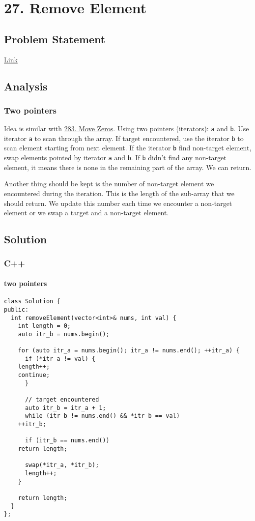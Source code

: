 \documentclass[12pt]{article}
\begin{document}
\section{27. Remove Element \label{orgfb555b2}}
\label{sec:orgef6978a}
\subsection{Problem Statement}
\label{sec:org105e06d}
\href{https://leetcode.com/problems/remove-element/}{Link}
\subsection{Analysis}
\label{sec:orgd986bad}
\subsubsection{Two pointers}
\label{sec:orge67f8c8}
Idea is similar with \hyperref[org251595e]{283. Move Zeros}. Using two pointers (iterators): \texttt{a} and \texttt{b}. Use iterator \texttt{a} to scan through the array. If target encountered, use the iterator \texttt{b} to scan element starting from next element. If the iterator \texttt{b} find non-target element, swap elements pointed by iterator \texttt{a} and \texttt{b}. If \texttt{b} didn't find any non-target element, it means there is none in the remaining part of the array. We can return.

Another thing should be kept is the number of non-target element we encountered during the iteration. This is the length of the sub-array that we should return. We update this number each time we encounter a non-target element or we swap a target and a non-target element.

\subsection{Solution}
\label{sec:orgae408b2}
\subsubsection{C++}
\label{sec:org5606cab}
\paragraph{two pointers}
\label{sec:orgdaadbb6}
\begin{verbatim}
class Solution {
public:
  int removeElement(vector<int>& nums, int val) {
    int length = 0;
    auto itr_b = nums.begin();

    for (auto itr_a = nums.begin(); itr_a != nums.end(); ++itr_a) {
      if (*itr_a != val) {
	length++;
	continue;
      }

      // target encountered
      auto itr_b = itr_a + 1;
      while (itr_b != nums.end() && *itr_b == val)
	++itr_b;

      if (itr_b == nums.end())
	return length;

      swap(*itr_a, *itr_b);
      length++;
    }

    return length;
  }
};
\end{verbatim}
\end{document}
